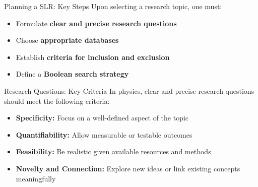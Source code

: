 \begin{frame}{Planning a SLR: Key Steps}
  Upon selecting a research topic, one must:

  \vspace{0.5cm}

  \pause
  \begin{itemize}
    \item Formulate \textbf{clear and precise research questions}
      \pause
    \item Choose \textbf{appropriate databases}
      \pause
    \item Establish \textbf{criteria for inclusion and exclusion}
      \pause
    \item Define a \textbf{Boolean search strategy}
  \end{itemize}
\end{frame}

\begin{frame}{Research Questions: Key Criteria}
  In physics, clear and precise research questions should meet the following criteria: \cite{Marder2011}

  \vspace{0.5cm}

  \pause
  \begin{itemize}
    \item \textbf{Specificity:} Focus on a well-defined aspect of the topic
      \pause
    \item \textbf{Quantifiability:} Allow measurable or testable outcomes
      \pause
    \item \textbf{Feasibility:} Be realistic given available resources and methods
      \pause
    \item \textbf{Novelty and Connection:} Explore new ideas or link existing concepts meaningfully
  \end{itemize}
\end{frame}

